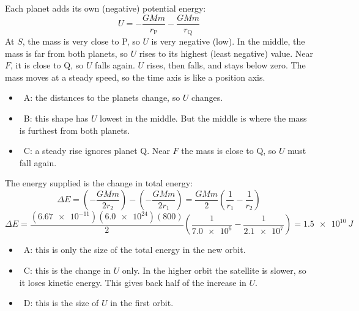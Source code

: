\documentclass[12pt]{article}
\begin{document}
\begin{practiceanswers}
\begin{practiceans}
  Each planet adds its own (negative) potential energy:
  \[ U = -\frac{GMm}{r_\mathrm{P}} - \frac{GMm}{r_\mathrm{Q}} \]
  At $S$, the mass is very close to P, so $U$ is very negative (low). In the middle, the mass is
  far from both planets, so $U$ rises to its highest (least negative) value. Near $F$, it is close
  to Q, so $U$ falls again. $U$ rises, then falls, and stays below zero. The mass moves at a
  steady speed, so the time axis is like a position axis.
  \begin{itemize}
    \item \xmark\ A: the distances to the planets change, so $U$ changes.
    \item \xmark\ B: this shape has $U$ lowest in the middle. But the middle is where the mass is
          furthest from both planets.
    \item \xmark\ C: a steady rise ignores planet Q. Near $F$ the mass is close to Q, so $U$ must
          fall again.
  \end{itemize}
\end{practiceans}

\begin{practiceans}
  The energy supplied is the change in total energy:
  \[ \Delta E = \left(-\frac{GMm}{2r_2}\right) - \left(-\frac{GMm}{2r_1}\right)
             = \frac{GMm}{2}\left(\frac{1}{r_1} - \frac{1}{r_2}\right) \]
  \[ \Delta E = \frac{(\num{6.67e-11})(\num{6.0e24})(800)}{2}
       \left(\frac{1}{\num{7.0e6}} - \frac{1}{\num{2.1e7}}\right) = \qty{1.5e10}{J} \]
  \begin{itemize}
    \item \xmark\ A: this is only the size of the total energy in the new orbit.
    \item \xmark\ C: this is the change in $U$ only. In the higher orbit the satellite is slower,
          so it loses kinetic energy. This gives back half of the increase in $U$.
    \item \xmark\ D: this is the size of $U$ in the first orbit.
  \end{itemize}
\end{practiceans}

\end{practiceanswers}
\end{document}
